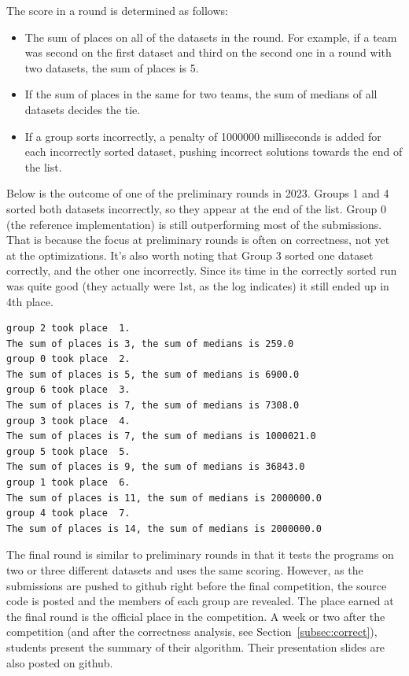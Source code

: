 \documentclass[12pt]{article}
\begin{document}
The score in a round is determined as follows:
\begin{itemize}
\item The sum of places on all of the datasets in the round. For example, if a team was second on the first dataset and third on the second one in a round with two datasets, the sum of places is 5. 
\item If the sum of places in the same for two teams, the sum of medians of all datasets decides the tie. 
\item If a group sorts incorrectly, a penalty of 1000000 milliseconds is added for each incorrectly sorted dataset, pushing incorrect solutions towards the end of the list.
\end{itemize}
Below is the outcome of one of the preliminary rounds in 2023. Groups 1 and 4 sorted both datasets incorrectly, so they appear at the end of the list. Group 0 (the reference implementation) is still outperforming most of the submissions. That is because the focus at preliminary rounds is often on correctness, not yet at the optimizations. It's also worth noting that Group 3 sorted one dataset correctly, and the other one incorrectly. Since its time in the correctly sorted run was quite good (they actually were 1st, as the log indicates) it still ended up in 4th place.    
\begin{verbatim}
group 2 took place  1. 
The sum of places is 3, the sum of medians is 259.0
group 0 took place  2. 
The sum of places is 5, the sum of medians is 6900.0
group 6 took place  3. 
The sum of places is 7, the sum of medians is 7308.0
group 3 took place  4. 
The sum of places is 7, the sum of medians is 1000021.0
group 5 took place  5. 
The sum of places is 9, the sum of medians is 36843.0
group 1 took place  6. 
The sum of places is 11, the sum of medians is 2000000.0
group 4 took place  7. 
The sum of places is 14, the sum of medians is 2000000.0
\end{verbatim}

The final round is similar to preliminary rounds in that it tests the programs on two or three different datasets and uses the same scoring. 
However, as the submissions are pushed to github right before the final competition, the source code is posted and the members of each group are revealed. 
The place earned at the final round is the official place in the competition. 
A week or two after the competition (and after the correctness analysis, see Section~\ref{subsec:correct}), students present the summary of their algorithm. 
Their presentation slides are also posted on github. 
\end{document}
